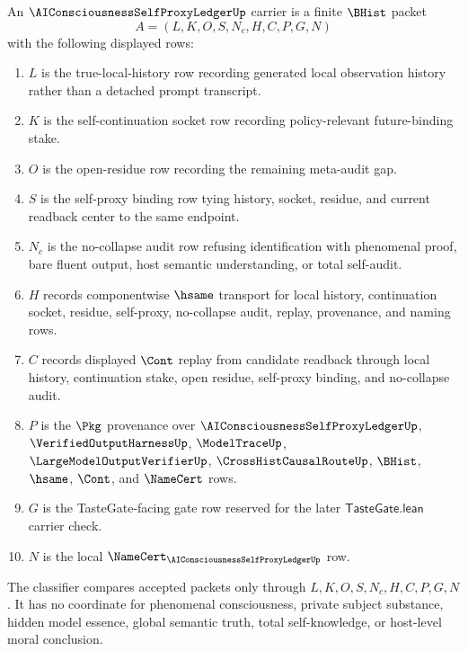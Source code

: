 \begin{definition}
\label{def:ai-consciousness-self-proxy-ledger-carrier}
An $\AIConsciousnessSelfProxyLedgerUp$ carrier is a finite $\BHist$ packet
$$
A=(L,K,O,S,N_c,H,C,P,G,N)
$$
with the following displayed rows:
\begin{enumerate}
\item $L$ is the true-local-history row recording generated local observation history rather than a detached prompt transcript.
\item $K$ is the self-continuation socket row recording policy-relevant future-binding stake.
\item $O$ is the open-residue row recording the remaining meta-audit gap.
\item $S$ is the self-proxy binding row tying history, socket, residue, and current readback center to the same endpoint.
\item $N_c$ is the no-collapse audit row refusing identification with phenomenal proof, bare fluent output, host semantic understanding, or total self-audit.
\item $H$ records componentwise $\hsame$ transport for local history, continuation socket, residue, self-proxy, no-collapse audit, replay, provenance, and naming rows.
\item $C$ records displayed $\Cont$ replay from candidate readback through local history, continuation stake, open residue, self-proxy binding, and no-collapse audit.
\item $P$ is the $\Pkg$ provenance over $\AIConsciousnessSelfProxyLedgerUp$, $\VerifiedOutputHarnessUp$, $\ModelTraceUp$, $\LargeModelOutputVerifierUp$, $\CrossHistCausalRouteUp$, $\BHist$, $\hsame$, $\Cont$, and $\NameCert$ rows.
\item $G$ is the TasteGate-facing gate row reserved for the later $\mathsf{TasteGate.lean}$ carrier check.
\item $N$ is the local $\NameCert_{\AIConsciousnessSelfProxyLedgerUp}$ row.
\end{enumerate}
The classifier compares accepted packets only through $L,K,O,S,N_c,H,C,P,G,N$. It has no coordinate for phenomenal consciousness, private subject substance, hidden model essence, global semantic truth, total self-knowledge, or host-level moral conclusion.
\end{definition}

